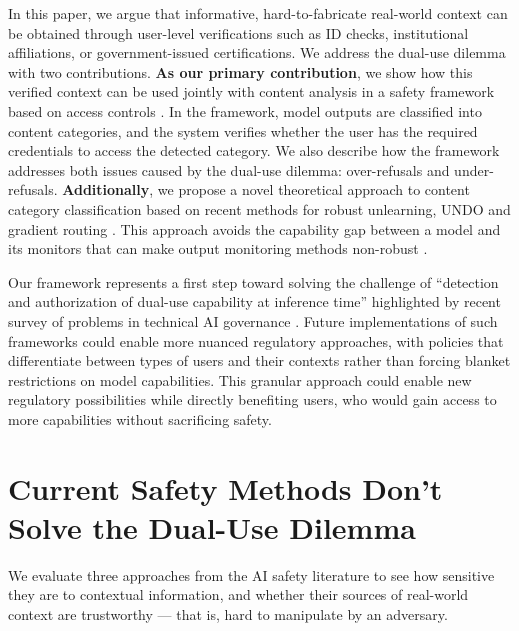 \documentclass{article}
\theoremstyle{plain}
\theoremstyle{definition}
\theoremstyle{remark}
\begin{document}
In this paper, we argue that informative, hard-to-fabricate real-world context can be obtained through user-level verifications such as ID checks, institutional affiliations, or government-issued certifications.
We address the dual-use dilemma with two contributions.
\textbf{As our primary contribution}, we show how this verified context can be used jointly with content analysis in a safety framework based on access controls \cite{butler1974}.
In the framework, model outputs are classified into content categories, and the system verifies whether the user has the required credentials to access the detected category.
We also describe how the framework addresses both issues caused by the dual-use dilemma: over-refusals and under-refusals.
\textbf{Additionally}, we propose a novel theoretical approach to content category classification based on recent methods for robust unlearning, UNDO \cite{lee2025distillationrobustifiesunlearning} and gradient routing \cite{cloud2024gradientroutingmaskinggradients}.
This approach avoids the capability gap between a model and its monitors that can make output monitoring methods non-robust \cite{jin2024jailbreakinglargelanguagemodels}.

Our framework represents a first step toward solving the challenge of ``detection and authorization of dual-use capability at inference time'' highlighted by recent survey of problems in technical AI governance \cite{reuel2025openproblemstechnicalai}.
Future implementations of such frameworks could enable more nuanced regulatory approaches, with policies that differentiate between types of users and their contexts rather than forcing blanket restrictions on model capabilities.
This granular approach could enable new regulatory possibilities while directly benefiting users, who would gain access to more capabilities without sacrificing safety.

\section{Current Safety Methods Don't Solve the Dual-Use Dilemma}
\label{section:current-methods}

We evaluate three approaches from the AI safety literature to see how sensitive they are to contextual information, and whether their sources of real-world context are trustworthy --- that is, hard to manipulate by an adversary.

\end{document}
